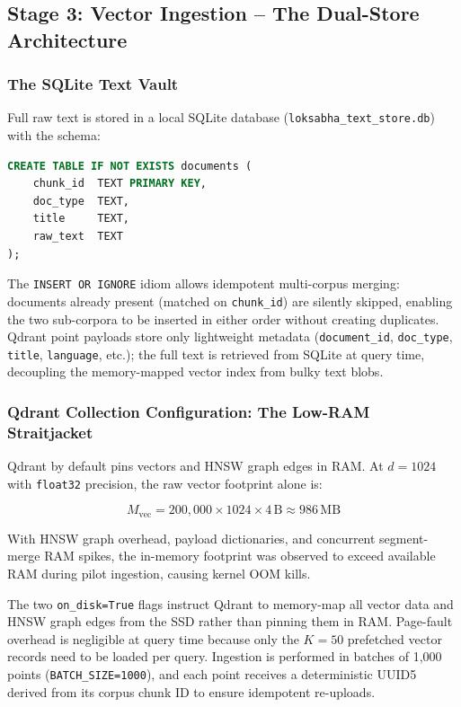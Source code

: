 \documentclass[conference]{IEEEtran}
\begin{document}
\subsection{Stage 3: Vector Ingestion -- The Dual-Store Architecture}
\label{sec:ingestion}

\subsubsection{The SQLite Text Vault}

Full raw text is stored in a local SQLite database (\texttt{loksabha\_text\_store.db})
with the schema:

\begin{lstlisting}[language=SQL,
  caption={SQLite documents table schema.}]
CREATE TABLE IF NOT EXISTS documents (
    chunk_id  TEXT PRIMARY KEY,
    doc_type  TEXT,
    title     TEXT,
    raw_text  TEXT
);
\end{lstlisting}

The \texttt{INSERT OR IGNORE} idiom allows idempotent multi-corpus merging:
documents already present (matched on \texttt{chunk\_id}) are silently
skipped, enabling the two sub-corpora to be inserted in either order without
creating duplicates.
Qdrant point payloads store only lightweight metadata (\texttt{document\_id},
\texttt{doc\_type}, \texttt{title}, \texttt{language}, etc.);
the full text is retrieved from SQLite at query time, decoupling the
memory-mapped vector index from bulky text blobs.

\subsubsection{Qdrant Collection Configuration: The Low-RAM Straitjacket}
\label{sec:qdrant-config}

Qdrant by default pins vectors and HNSW graph edges in RAM.
At $d=1024$ with \texttt{float32} precision, the raw vector footprint alone is:

\begin{equation}
  M_\text{vec} = 200{,}000 \times 1024 \times 4\,\text{B}
  \approx 986\,\text{MB}
  \label{eq:ramvec}
\end{equation}

With HNSW graph overhead, payload dictionaries, and concurrent segment-merge
RAM spikes, the in-memory footprint was observed to exceed available RAM
during pilot ingestion, causing kernel OOM kills.

The two \texttt{on\_disk=True} flags instruct Qdrant to memory-map all
vector data and HNSW graph edges from the SSD rather than pinning them in
RAM.
Page-fault overhead is negligible at query time because only the $K=50$
prefetched vector records need to be loaded per query.
Ingestion is performed in batches of 1,000 points (\texttt{BATCH\_SIZE=1000}),
and each point receives a deterministic UUID5 derived from its corpus chunk ID
to ensure idempotent re-uploads.
\end{document}
